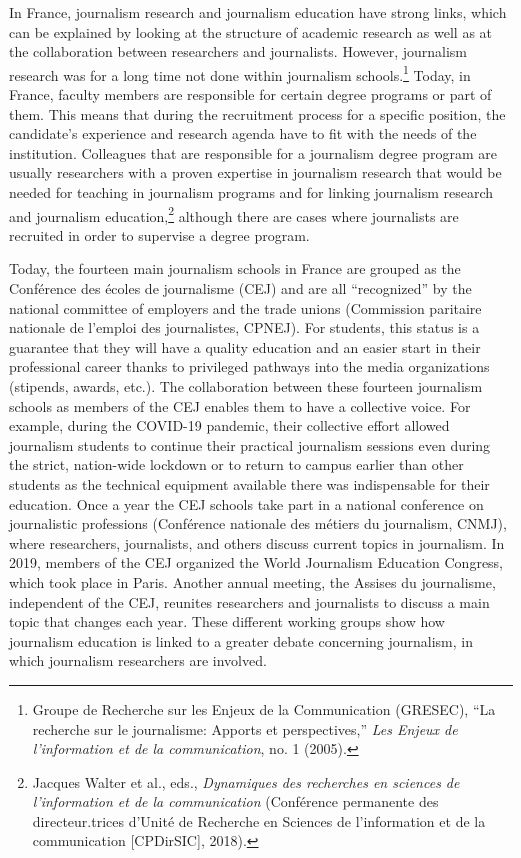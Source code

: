\documentclass{tufte-handout}
\begin{document}
In France, journalism research and journalism education have strong
links, which can be explained by looking at the structure of academic
research as well as at the collaboration between researchers and
journalists. However, journalism research was for a long time not done
within journalism schools.\footnote{Groupe de Recherche sur les Enjeux
  de la Communication (GRESEC), ``La recherche sur le journalisme:
  Apports et perspectives,'' \emph{Les Enjeux de l'information et de la
  communication}, no. 1 (2005).} Today, in France, faculty members are
responsible for certain degree programs or part of them. This means that
during the recruitment process for a specific position, the candidate's
experience and research agenda have to fit with the needs of the
institution. Colleagues that are responsible for a journalism degree
program are usually researchers with a proven expertise in journalism
research that would be needed for teaching in journalism programs and
for linking journalism research and journalism education,\footnote{Jacques
  Walter et al., eds., \emph{Dynamiques des recherches en sciences de
  l'information et de la communication} (Conférence permanente des
  directeur.trices d'Unité de Recherche en Sciences de l'information et
  de la communication {[}CPDirSIC{]}, 2018).} although there are cases
where journalists are recruited in order to supervise a degree program.

Today, the fourteen main journalism schools in France are grouped as the
Conférence des écoles de journalisme (CEJ) and are all ``recognized'' by
the national committee of employers and the trade unions (Commission
paritaire nationale de l'emploi des journalistes, CPNEJ). For students,
this status is a guarantee that they will have a quality education and
an easier start in their professional career thanks to privileged
pathways into the media organizations (stipends, awards, etc.). The
collaboration between these fourteen journalism schools as members of
the CEJ enables them to have a collective voice. For example, during the
COVID-19 pandemic, their collective effort allowed journalism students
to continue their practical journalism sessions even during the strict,
nation-wide lockdown or to return to campus earlier than other students
as the technical equipment available there was indispensable for their
education. Once a year the CEJ schools take part in a national
conference on journalistic professions (Conférence nationale des métiers
du journalism, CNMJ), where researchers, journalists, and others discuss
current topics in journalism. In 2019, members of the CEJ organized the
World Journalism Education Congress, which took place in Paris. Another
annual meeting, the Assises du journalisme, independent of the CEJ,
reunites researchers and journalists to discuss a main topic that
changes each year. These different working groups show how journalism
education is linked to a greater debate concerning journalism, in which
journalism researchers are involved.
\end{document}

